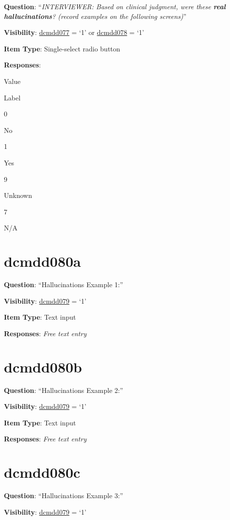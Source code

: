 \documentclass[]{book}
\begin{document}
\textbf{Question}: ``\emph{INTERVIEWER: Based on clinical judgment, were these \textbf{real hallucinations}? (record examples on the following screens)}''

\textbf{Visibility}: \protect\hyperlink{dcmdd077}{dcmdd077} = `1' or \protect\hyperlink{dcmdd078}{dcmdd078} = `1'

\textbf{Item Type}: Single-select radio button

\textbf{Responses}:

Value

Label

0

No

1

Yes

9

Unknown

7

N/A

\hypertarget{dcmdd080a}{%
\section{dcmdd080a}\label{dcmdd080a}}

\textbf{Question}: ``Hallucinations Example 1:''

\textbf{Visibility}: \protect\hyperlink{dcmdd079}{dcmdd079} = `1'

\textbf{Item Type}: Text input

\textbf{Responses}: \emph{Free text entry}

\hypertarget{dcmdd080b}{%
\section{dcmdd080b}\label{dcmdd080b}}

\textbf{Question}: ``Hallucinations Example 2:''

\textbf{Visibility}: \protect\hyperlink{dcmdd079}{dcmdd079} = `1'

\textbf{Item Type}: Text input

\textbf{Responses}: \emph{Free text entry}

\hypertarget{dcmdd080c}{%
\section{dcmdd080c}\label{dcmdd080c}}

\textbf{Question}: ``Hallucinations Example 3:''

\textbf{Visibility}: \protect\hyperlink{dcmdd079}{dcmdd079} = `1'
\end{document}
